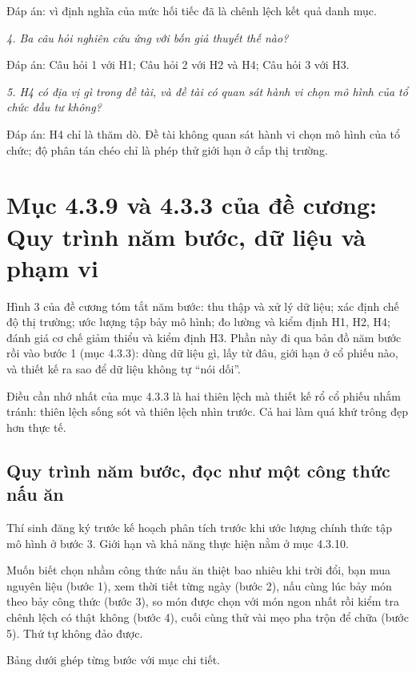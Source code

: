 Đáp án: vì định nghĩa của mức hối tiếc đã là chênh lệch kết quả danh mục.

{\itshape 4. Ba câu hỏi nghiên cứu ứng với bốn giả thuyết thế nào?\par}

Đáp án: Câu hỏi 1 với H1; Câu hỏi 2 với H2 và H4; Câu hỏi 3 với H3.

{\itshape 5. H4 có địa vị gì trong đề tài, và đề tài có quan sát hành vi chọn mô hình của tổ chức đầu tư không?\par}

Đáp án: H4 chỉ là thăm dò. Đề tài không quan sát hành vi chọn mô hình của tổ chức; độ phân tán chéo chỉ là phép thử giới hạn ở cấp thị trường.

\chapter{Mục 4.3.9 và 4.3.3 của đề cương: Quy trình năm bước, dữ liệu và phạm vi}

Hình 3 của đề cương tóm tắt năm bước: thu thập và xử lý dữ liệu; xác định chế độ thị trường; ước lượng tập bảy mô hình; đo lường và kiểm định H1, H2, H4; đánh giá cơ chế giảm thiểu và kiểm định H3. Phần này đi qua bản đồ năm bước rồi vào bước 1 (mục 4.3.3): dùng dữ liệu gì, lấy từ đâu, giới hạn ở cổ phiếu nào, và thiết kế ra sao để dữ liệu không tự “nói dối”.

Điều cần nhớ nhất của mục 4.3.3 là hai thiên lệch mà thiết kế rổ cổ phiếu nhắm tránh: thiên lệch sống sót và thiên lệch nhìn trước. Cả hai làm quá khứ trông đẹp hơn thực tế.

\section{Quy trình năm bước, đọc như một công thức nấu ăn}

Thí sinh đăng ký trước kế hoạch phân tích trước khi ước lượng chính thức tập mô hình ở bước 3. Giới hạn và khả năng thực hiện nằm ở mục 4.3.10.

Muốn biết chọn nhầm công thức nấu ăn thiệt bao nhiêu khi trời đổi, bạn mua nguyên liệu (bước 1), xem thời tiết từng ngày (bước 2), nấu cùng lúc bảy món theo bảy công thức (bước 3), so món được chọn với món ngon nhất rồi kiểm tra chênh lệch có thật không (bước 4), cuối cùng thử vài mẹo pha trộn để chữa (bước 5). Thứ tự không đảo được.

Bảng dưới ghép từng bước với mục chi tiết.

